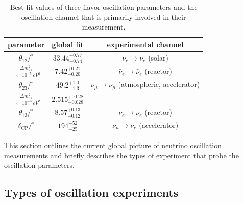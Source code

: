 \begin{table}
\caption{Best fit values of three-flavor oscillation parameters and the oscillation channel that is primarily involved in their measurement.\label{tab:global-bfp}}
\begin{tabular}{ccc}\toprule
    parameter & global fit & experimental channel \\ \midrule
    $\theta_{12}/^\circ$                    & $33.44^{+0.77}_{-0.74}$   & $\nu_e \rightarrow \nu_e$ (solar)\\
    $\frac{\Delta m^2_{21}}{\SI{e-5}{eV^2}}$& $7.42^{+0.21}_{-0.20}$    & $\bar{\nu}_e \rightarrow \bar{\nu}_e$ (reactor)\\
    $\theta_{23}/^\circ$                    & $49.2^{+1.0}_{-1.3} $     & $\nu_\mu \rightarrow \nu_\mu$  (atmospheric, accelerator)\\
    $\frac{\Delta m^2_{31}}{\SI{e-3}{eV^2}}$& $2.515^{+0.028}_{-0.028}$ & \\
    $\theta_{13}/^\circ$                    & $8.57^{+0.13}_{-0.12} $   & $\bar{\nu}_e \rightarrow \bar{\nu}_e$ (reactor)\\
    $\delta_\mathrm{CP}/^\circ$             & $194^{+52}_{-25}$         & $\nu_\mu \rightarrow \nu_e$ (accelerator)\\ \bottomrule
\end{tabular}
\end{table}
This section outlines the current global picture of neutrino oscillation measurements and briefly describes the types of experiment that probe the oscillation parameters.

\subsection{Types of oscillation experiments}

